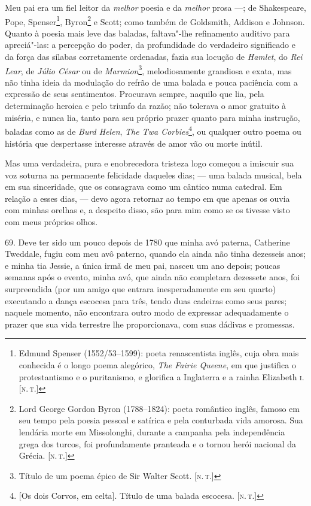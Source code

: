 Meu pai era um fiel leitor da \emph{melhor} poesia e da \emph{melhor}
prosa ---; de Shakespeare, Pope, Spenser\footnote{Edmund Spenser (1552/53--1599): poeta renascentista inglês, cuja obra mais conhecida é o
  longo poema alegórico, \emph{The Fairie Queene}, em que justifica o
  protestantismo e o puritanismo, e glorifica a Inglaterra e a rainha
  Elizabeth \textsc{i}. {[}\textsc{n.\,t.}{]}}, Byron\footnote{Lord George Gordon Byron
  (1788--1824): poeta romântico inglês, famoso em seu tempo pela
  poesia pessoal e satírica e pela conturbada vida amorosa. Sua lendária
  morte em Missolonghi, durante a campanha pela independência grega dos
  turcos, foi profundamente pranteada e o tornou herói nacional da
  Grécia. {[}\textsc{n.\,t.}{]}} e Scott; como também de Goldsmith, Addison e
Johnson. Quanto à poesia mais leve das baladas, faltava"-lhe refinamento
auditivo para apreciá"-las: a percepção do poder, da profundidade do
verdadeiro significado e da força das sílabas corretamente ordenadas,
fazia sua locução de \emph{Hamlet}, do \emph{Rei Lear}, de \emph{Júlio
César} ou de \emph{Marmion}\footnote{Título de um poema épico de Sir
  Walter Scott. {[}\textsc{n.\,t.}{]}}, melodiosamente grandiosa e exata, mas
não tinha ideia da modulação do refrão de uma balada e pouca paciência
com a expressão de seus sentimentos. Procurava sempre, naquilo que lia,
pela determinação heroica e pelo triunfo da razão; não tolerava o amor
gratuito à miséria, e nunca lia, tanto para seu próprio prazer quanto
para minha instrução, baladas como as de \emph{Burd Helen}, \emph{The
Twa Corbies}\footnote{{[}Os dois Corvos, em celta{]}. Título de uma
  balada escocesa. {[}\textsc{n.\,t.}{]}}, ou qualquer outro poema ou história
que despertasse interesse através de amor vão ou morte inútil.

Mas uma verdadeira, pura e enobrecedora tristeza logo começou a imiscuir
sua voz soturna na permanente felicidade daqueles dias; --- uma balada
musical, bela em sua sinceridade, que os consagrava como um cântico numa
catedral. Em relação a esses dias, --- devo agora retornar ao tempo em
que apenas os ouvia com minhas orelhas e, a despeito disso, são para mim
como se os tivesse visto com meus próprios olhos.

69. Deve ter sido um pouco depois de 1780 que minha avó paterna,
Catherine Tweddale, fugiu com meu avô paterno, quando ela ainda não
tinha dezesseis anos; e minha tia Jessie, a única irmã de meu pai,
nasceu um ano depois; poucas semanas após o evento, minha avó, que ainda
não completara dezessete anos, foi surpreendida (por um amigo que
entrara inesperadamente em seu quarto) executando a dança escocesa para
três, tendo duas cadeiras como seus pares; naquele momento, não
encontrara outro modo de expressar adequadamente o prazer que sua vida
terrestre lhe proporcionava, com suas dádivas e promessas.

